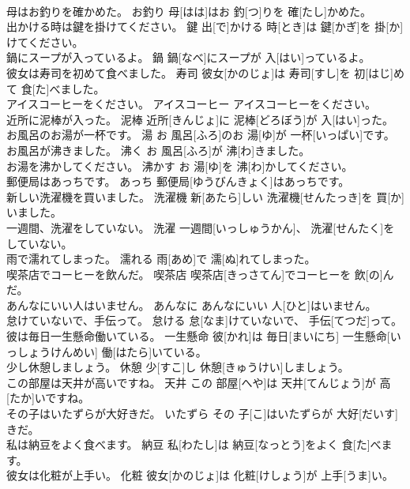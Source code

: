 \documentclass[8pt]{extreport}
\begin{document}
\begin{CJK}{UTF8}{min}
\\	母はお釣りを確かめた。	お釣り	母[はは]はお 釣[つ]りを 確[たし]かめた。	
\\	出かける時は鍵を掛けてください。	鍵	出[で]かける 時[とき]は 鍵[かぎ]を 掛[か]けてください。	
\\	鍋にスープが入っているよ。	鍋	鍋[なべ]にスープが 入[はい]っているよ。	
\\	彼女は寿司を初めて食べました。	寿司	彼女[かのじょ]は 寿司[すし]を 初[はじ]めて 食[た]べました。	
\\	アイスコーヒーをください。	アイスコーヒー	アイスコーヒーをください。	
\\	近所に泥棒が入った。	泥棒	近所[きんじょ]に 泥棒[どろぼう]が 入[はい]った。	
\\	お風呂のお湯が一杯です。	湯	お 風呂[ふろ]のお 湯[ゆ]が 一杯[いっぱい]です。	
\\	お風呂が沸きました。	沸く	お 風呂[ふろ]が 沸[わ]きました。	
\\	お湯を沸かしてください。	沸かす	お 湯[ゆ]を 沸[わ]かしてください。	
\\	郵便局はあっちです。	あっち	郵便局[ゆうびんきょく]はあっちです。	
\\	新しい洗濯機を買いました。	洗濯機	新[あたら]しい 洗濯機[せんたっき]を 買[か]いました。	
\\	一週間、洗濯をしていない。	洗濯	一週間[いっしゅうかん]、 洗濯[せんたく]をしていない。	
\\	雨で濡れてしまった。	濡れる	雨[あめ]で 濡[ぬ]れてしまった。	
\\	喫茶店でコーヒーを飲んだ。	喫茶店	喫茶店[きっさてん]でコーヒーを 飲[の]んだ。	
\\	あんなにいい人はいません。	あんなに	あんなにいい 人[ひと]はいません。	
\\	怠けていないで、手伝って。	怠ける	怠[なま]けていないで、 手伝[てつだ]って。	
\\	彼は毎日一生懸命働いている。	一生懸命	彼[かれ]は 毎日[まいにち] 一生懸命[いっしょうけんめい] 働[はたら]いている。	
\\	少し休憩しましょう。	休憩	少[すこ]し 休憩[きゅうけい]しましょう。	
\\	この部屋は天井が高いですね。	天井	この 部屋[へや]は 天井[てんじょう]が 高[たか]いですね。	
\\	その子はいたずらが大好きだ。	いたずら	その 子[こ]はいたずらが 大好[だいす]きだ。	
\\	私は納豆をよく食べます。	納豆	私[わたし]は 納豆[なっとう]をよく 食[た]べます。	
\\	彼女は化粧が上手い。	化粧	彼女[かのじょ]は 化粧[けしょう]が 上手[うま]い。	

\end{CJK}
\end{document}
